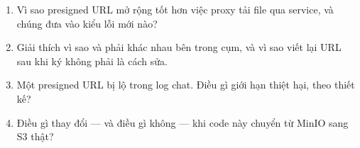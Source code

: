 \begin{quiz}
\begin{enumerate}
  \item Vì sao presigned URL mở rộng tốt hơn việc proxy tải file qua
  service, và chúng đưa vào kiểu lỗi mới nào?
  \item Giải thích vì sao  và  phải
  khác nhau bên trong cụm, và vì sao viết lại URL sau khi ký không phải
  là cách sửa.
  \item Một presigned URL bị lộ trong log chat. Điều gì giới hạn thiệt
  hại, theo thiết kế?
  \item Điều gì thay đổi --- và điều gì không --- khi code này chuyển từ
  MinIO sang S3 thật?
\end{enumerate}
\end{quiz}
